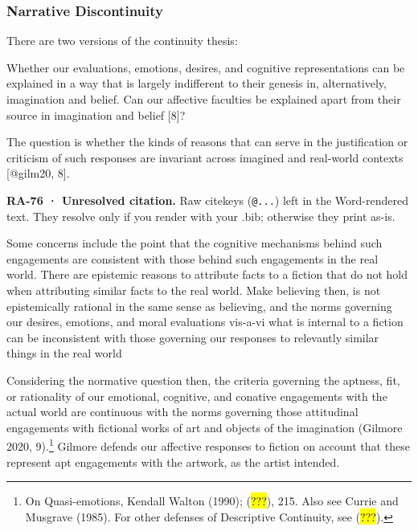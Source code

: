 \documentclass[
  letterpaper,
  DIV=11,
  numbers=noendperiod]{scrartcl}
\theoremstyle{remark}
\begin{document}
\subsubsection{Narrative Discontinuity}\label{narrative-discontinuity}

There are two versions of the continuity thesis:

Whether our evaluations, emotions, desires, and cognitive
representations can be explained in a way that is largely indifferent to
their genesis in, alternatively, imagination and belief. Can our
affective faculties be explained apart from their source in imagination
and belief {[}8{]}?

The question is whether the kinds of reasons that can serve in the
justification or criticism of such responses are invariant across
imagined and real-world contexts {[}@gilm20, 8{]}.

\begin{tcolorbox}[enhanced jigsaw, arc=.35mm, bottomrule=.15mm, bottomtitle=1mm, breakable, colback=white, colbacktitle=quarto-callout-warning-color!10!white, colframe=quarto-callout-warning-color-frame, coltitle=black, left=2mm, leftrule=.75mm, opacityback=0, opacitybacktitle=0.6, rightrule=.15mm, title=\textcolor{quarto-callout-warning-color}{\faExclamationTriangle}\hspace{0.5em}{Warning}, titlerule=0mm, toprule=.15mm, toptitle=1mm]

\textbf{RA-76 · Unresolved citation.} Raw citekeys (\texttt{@...}) left
in the Word-rendered text. They resolve only if you render with your
.bib; otherwise they print as-is.

\end{tcolorbox}

Some concerns include the point that the cognitive mechanisms behind
such engagements are consistent with those behind such engagements in
the real world. There are epistemic reasons to attribute facts to a
fiction that do not hold when attributing similar facts to the real
world. Make believing then, is not epistemically rational in the same
sense as believing, and the norms governing our desires, emotions, and
moral evaluations vis-a-vi what is internal to a fiction can be
inconsistent with those governing our responses to relevantly similar
things in the real world

Considering the normative question then, the criteria governing the
aptness, fit, or rationality of our emotional, cognitive, and conative
engagements with the actual world are continuous with the norms
governing those attitudinal engagements with fictional works of art and
objects of the imagination (Gilmore 2020, 9).\footnote{On
  Quasi-emotions, Kendall Walton (1990); (\hl{???}), 215. Also see
  Currie and Musgrave (1985). For other defenses of Descriptive
  Continuity, see (\hl{???}).} Gilmore defends our affective responses
to fiction on account that these represent apt engagements with the
artwork, as the artist intended.
\end{document}
